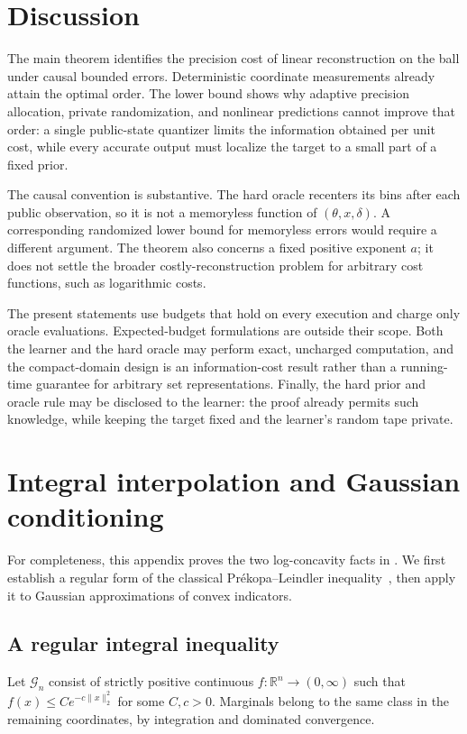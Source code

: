 \documentclass[11pt,a4paper]{article}
\newcommand{\R}{\mathbb R}
\newcommand{\norm}[1]{\lVert #1\rVert}
\theoremstyle{definition}
\theoremstyle{remark}
\begin{document}
\section{Discussion}\label{sec:discussion}
The main theorem identifies the precision cost of linear reconstruction on the ball under causal bounded errors. Deterministic coordinate measurements already attain the optimal order. The lower bound shows why adaptive precision allocation, private randomization, and nonlinear predictions cannot improve that order: a single public-state quantizer limits the information obtained per unit cost, while every accurate output must localize the target to a small part of a fixed prior.

The causal convention is substantive. The hard oracle recenters its bins after each public observation, so it is not a memoryless function of $(\theta,x,\delta)$. A corresponding randomized lower bound for memoryless errors would require a different argument. The theorem also concerns a fixed positive exponent $a$; it does not settle the broader costly-reconstruction problem for arbitrary cost functions, such as logarithmic costs.

The present statements use budgets that hold on every execution and charge only oracle evaluations. Expected-budget formulations are outside their scope. Both the learner and the hard oracle may perform exact, uncharged computation, and the compact-domain design is an information-cost result rather than a running-time guarantee for arbitrary set representations. Finally, the hard prior and oracle rule may be disclosed to the learner: the proof already permits such knowledge, while keeping the target fixed and the learner's random tape private.

\appendix
\section{Integral interpolation and Gaussian conditioning}\label{app:PL}
For completeness, this appendix proves the two log-concavity facts in . We first establish a regular form of the classical Pr\'ekopa--Leindler inequality~\cite{Prekopa73}, then apply it to Gaussian approximations of convex indicators.

\subsection{A regular integral inequality}
Let $\mathcal G_n$ consist of strictly positive continuous $f:\R^n\to(0,\infty)$ such that $f(x)\le C e^{-c\norm{x}_2^2}$ for some $C,c>0$. Marginals belong to the same class in the remaining coordinates, by integration and dominated convergence.
\end{document}
